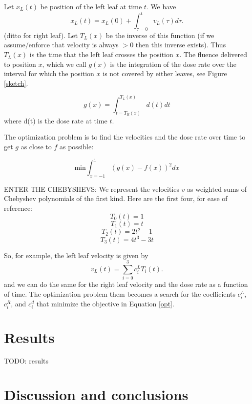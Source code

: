 \documentclass[12pt]{article}
\begin{document}
Let $x_L(t)$ be position of the left leaf at time $t$. We have
\begin{equation}
  x_L(t) = x_L(0) + \int_{\tau=0}^t v_L(\tau) d\tau.
\end{equation}
\noindent (ditto for right leaf). Let $T_L(x)$ be the inverse of this function
(if we assume/enforce that velocity is always $>0$ then this inverse exists). Thus
$T_L(x)$ is the time that the left leaf crosses the position $x$. The fluence delivered to position
$x$, which we call $g(x)$ is the integration of the dose rate over the interval for which the position $x$ is not covered by either leaves, see Figure \ref{sketch}.


\begin{equation}
  g(x) = \int_{t = T_R(x)}^{T_L(x)} d(t) dt
\end{equation}
\noindent where d(t) is the dose rate at time $t$.

The optimization problem is to find the velocities and the dose rate over time to get $g$ as close to $f$ as possible:

\begin{equation}
\mathrm{min} \int_{x=-1}^1 \left ( g(x) - f(x) \right )^2 dx
\label{opt}
\end{equation}

ENTER THE CHEBYSHEVS: We represent the velocities $v$ as weighted sums of Chebyshev polynomials of the first kind.
Here are the first four, for ease of reference:
$$
T_0(t) = 1
$$
$$
T_1(t) = t
$$
$$
T_2(t) = 2t^2 -1
$$
$$
T_3(t) = 4t^3 - 3t
$$


So, for example, the left leaf velocity is given by
$$
v_L(t) = \sum_{i=0}^3 c^L_i T_i(t).
$$
\noindent and we can do the same for the right leaf velocity and the dose rate as a function of time.
The optimization problem them becomes a search for the coefficients $c^L_i$, $c^R_i$, and $c^d_i$ that minimize the objective in Equation \ref{opt}.

\section{Results}

TODO:  results

\section{Discussion and conclusions}



\end{document}
